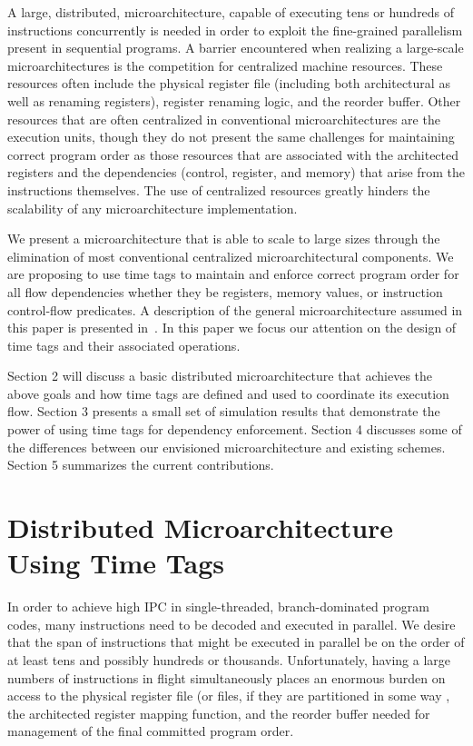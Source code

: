 \documentclass[10pt,dvips]{article}
\begin{document}
A large, distributed, microarchitecture, capable of executing tens or 
hundreds of instructions concurrently
is needed in order to exploit the fine-grained parallelism present 
in sequential programs.
A barrier encountered when realizing a large-scale microarchitectures is the
competition for centralized machine resources.
These resources often include the 
physical register file (including both architectural as well as renaming 
registers), register renaming logic,
and the reorder buffer.  Other resources that are often centralized
in conventional microarchitectures are the execution units, though they
do not present the same challenges for maintaining correct program order
as those resources that are associated with the architected registers
and the dependencies (control, register, and memory) that arise
from the instructions themselves.  The use of centralized resources
greatly hinders the scalability of any microarchitecture implementation. 

We present a microarchitecture that is able to scale to large sizes
through the
elimination of most conventional centralized microarchitectural components.
We are proposing to use time tags to maintain 
and enforce correct program order for all flow dependencies whether
they be registers, memory values, or instruction control-flow predicates.
A description of the general microarchitecture
assumed in this paper is presented in~\cite{Uht01}.  
In this paper
we focus our attention on the design of time tags and their
associated operations.

Section 2 will discuss a basic distributed microarchitecture that
achieves the above goals and how time tags are defined and used
to coordinate its execution flow.  
Section 3 presents a small set of simulation results that demonstrate
the power of using time tags for dependency enforcement. 
Section 4 discusses some of the differences between our envisioned
microarchitecture and existing schemes.
Section 5 summarizes the current contributions.
%
%
\section{Distributed Microarchitecture Using Time Tags}
%
In order to achieve high IPC in single-threaded, branch-dominated 
program codes, many instructions need to be decoded and executed
in parallel.  We desire that the span of instructions that might be
executed in parallel be on the order of at least tens and possibly hundreds
or thousands.  
Unfortunately, having a large numbers of instructions
in flight simultaneously places an enormous burden on access to 
the physical register file 
(or files, if they are partitioned in some way \cite{Jiser00},
the architected register mapping function, and the reorder buffer 
needed for
management of the final committed program order.
\end{document}
